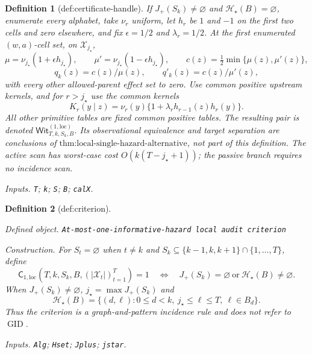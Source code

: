 \documentclass{article}
\newtheorem{definition}{Definition}
\begin{document}
\begin{definition}[def:certificate-handle]
If \(J_+(S_k)\ne\varnothing\) and \(\mathcal H_\star(B)=\varnothing\), enumerate every alphabet, take \(\nu_r\) uniform, let \(h_r\) be \(1\) and \(-1\) on the first two cells and zero elsewhere, and fix \(\epsilon=1/2\) and \(\lambda_r=1/2\).  At the first enumerated \((w,a)\)-cell set, on \(\mathcal X_{j_\star}\),
\[
\mu=\nu_{j_\star}(1+\epsilon h_{j_\star}),\qquad
\mu'=\nu_{j_\star}(1-\epsilon h_{j_\star}),\qquad
c(z)=\tfrac12\min\{\mu(z),\mu'(z)\},
\]
\[
q_k(z)=c(z)/\mu(z),\qquad q'_k(z)=c(z)/\mu'(z),
\]
with every other allowed-parent effect set to zero.  Use common positive upstream kernels, and for \(r>j_\star\) use the common kernels
\[
K_r(y\mid z)=\nu_r(y)
\{1+\lambda_r h_{r-1}(z)h_r(y)\}.
\]
All other primitive tables are fixed common positive tables.  The resulting pair is denoted
\(\mathsf{Wit}^{(1,\mathrm{loc})}_{T,k,S_k,B}\).  Its observational equivalence and target separation are conclusions of \(\text{thm:local-single-hazard-alternative}\), not part of this definition.  The active scan has worst-case cost \(O(k(T-j_\star+1))\); the passive branch requires no incidence scan.
\par\smallskip\noindent\emph{Inputs.} \texttt{T}; \texttt{k}; \texttt{S}; \texttt{B}; \texttt{calX}.
\end{definition}

\begin{definition}[def:criterion]\label{def:criterion}
\par\smallskip\noindent\emph{Defined object.} \texttt{At-\allowbreak{}most-\allowbreak{}one-\allowbreak{}informative-\allowbreak{}hazard local audit criterion}
\par\smallskip\noindent\emph{Construction.} For \(S_t=\varnothing\) when \(t\ne k\) and
\(S_k\subseteq\{k-1,k,k+1\}\cap\{1,\ldots,T\}\), define
\[
\mathsf C_{1,\mathrm{loc}}(T,k,S_k,B,(|\mathcal X_t|)_{t=1}^T)=1
\quad\Longleftrightarrow\quad
J_+(S_k)=\varnothing
\ \text{or}\ 
\mathcal H_\star(B)\ne\varnothing.
\]
When \(J_+(S_k)\ne\varnothing\), \(j_\star=\max J_+(S_k)\) and
\[
\mathcal H_\star(B)=
\{(d,\ell):0\le d<k,\ j_\star\le\ell\le T,\ \ell\in B_d\}.
\]
Thus the criterion is a graph-and-pattern incidence rule and does not refer to \(\operatorname{GID}\).
\par\smallskip\noindent\emph{Inputs.} \texttt{Alg}; \texttt{Hset}; \texttt{Jplus}; \texttt{jstar}.
\end{definition}
\end{document}
